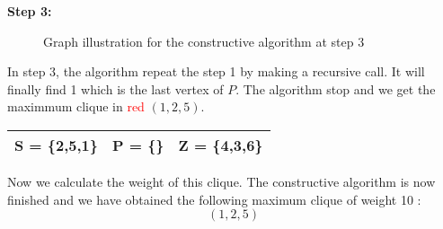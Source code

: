     \vspace{1\baselineskip}

    \begin{minipage}{\linewidth}
        \textbf{Step 3:} \newline
        \begin{minipage}{0.4\textwidth}
            \begin{figure}[H]
                \centering
                \caption{Graph illustration for the constructive algorithm at step 3}
                \label{fig:constructive-mewc-edge-step3}
            \end{figure}
        \end{minipage}
        \begin{minipage}{0.6\textwidth}
            In step 3, the algorithm repeat the step 1 by making a recursive call. It will finally find 1 which is the last vertex of $P$. The algorithm stop and we get the maximmum clique in \textcolor{red}{red} $(1,2,5)$.
    
            \begin{center}
                \begin{tabular}{|lll|}
                    \hline
                    S = \{2,5,1\} & P = \{\} & Z = \{4,3,6\} \\
                    \hline
                \end{tabular}
            \end{center}
        \end{minipage}
    \end{minipage}

    \vspace{1\baselineskip}

    Now we calculate the weight of this clique. The constructive algorithm is now finished and we have obtained the following maximum clique of weight 10 : $$(1,2,5)$$

\newpage

